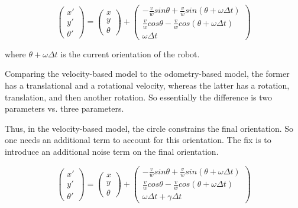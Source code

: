 \documentclass[a4paper]{article}
\begin{document}
\begin{enumerate}
    \begin{equation*}
        \begin{pmatrix}
        x' \\ y' \\ \theta '
        \end{pmatrix}
        =
        \begin{pmatrix}
        x \\ y \\ \theta
        \end{pmatrix}
        +
        \begin{pmatrix}
        - \frac{v}{w} sin\theta + \frac{v}{w} sin (\theta + \omega \Delta t)
        \\ \frac{v}{w} cos\theta - \frac{v}{w} cos (\theta + \omega \Delta t) 
        \\ \omega \Delta t
        \end{pmatrix}
    \end{equation*}
    
    where $\theta + \omega \Delta t$ is the current orientation of the robot.
    
    Comparing the velocity-based model to the odometry-based model, the former has a translational and a rotational velocity, whereas the latter has a rotation, translation, and then another rotation. So essentially the difference is two parameters vs. three parameters. 

    Thus, in the velocity-based model, the circle constrains the final orientation. So one needs an additional term to account for this orientation. The fix is to introduce an additional noise term on the final orientation.
    
    \begin{equation*}
            \begin{pmatrix}
            x' \\ y' \\ \theta '
            \end{pmatrix}
            =
            \begin{pmatrix}
            x \\ y \\ \theta
            \end{pmatrix}
            +
            \begin{pmatrix}
            - \frac{v}{w} sin\theta + \frac{v}{w} sin (\theta + \omega \Delta t)
            \\ \frac{v}{w} cos\theta - \frac{v}{w} cos (\theta + \omega \Delta t) 
            \\ \omega \Delta t + \gamma \Delta t
            \end{pmatrix}
    \end{equation*}
    

\end{enumerate}
\end{document}
